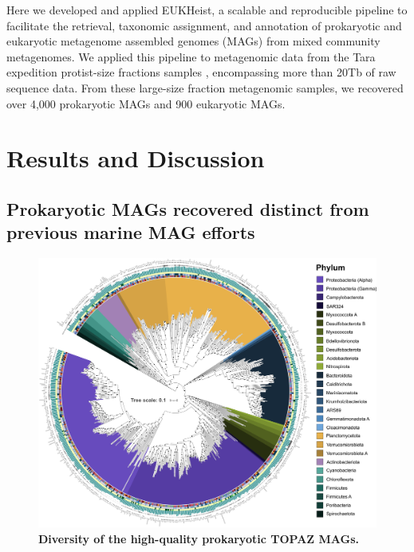 \documentclass[12pt]{article}
\numberwithin{equation}{section}
\begin{document}
Here we developed and applied EUKHeist, a scalable and reproducible pipeline to facilitate the retrieval, taxonomic assignment, and annotation of prokaryotic and eukaryotic metagenome assembled genomes (MAGs) from mixed community metagenomes. We applied this pipeline to metagenomic data from the Tara expedition protist-size fractions samples \citep{Carradec2018global}, encompassing more than 20Tb of raw sequence data. From these large-size fraction metagenomic samples, we recovered over 4,000 prokaryotic MAGs and 900 eukaryotic MAGs. 

\section*{Results and Discussion}
\subsection*{Prokaryotic MAGs recovered distinct from previous marine MAG efforts}




\begin{figure}[h!]    
    \centering
    \includegraphics[width = 0.95\columnwidth]{figures/Figure1-TOPAZ-HQ-NR_bac.png}
    \caption{\textbf{Diversity of the high-quality prokaryotic TOPAZ MAGs.} }
    \label{fig:fig4-trophy}
\end{figure}
\end{document}

